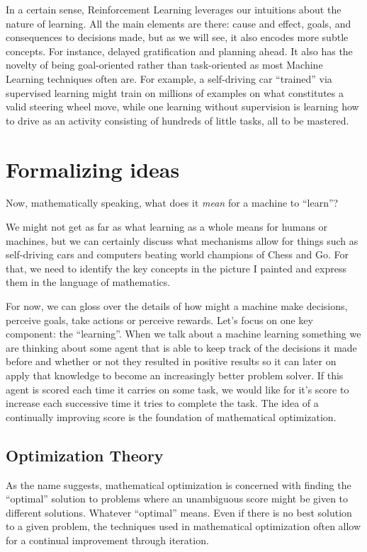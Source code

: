 In a certain sense, Reinforcement Learning leverages our 
intuitions about the nature of learning. All the main elements 
are there: cause and effect, goals, and consequences to 
decisions made, but as we will see, it also encodes more subtle 
concepts. For instance, delayed gratification and planning 
ahead. It also has the novelty of being goal-oriented rather 
than task-oriented as most Machine Learning techniques often 
are. For example, a self-driving car ``trained'' via supervised 
learning might train on millions of examples on what constitutes 
a valid steering wheel move, while one learning without 
supervision is learning how to drive as an activity consisting 
of hundreds of little tasks, all to be mastered.

\section{Formalizing ideas}
Now, mathematically speaking, what does it \textit{mean} for a 
machine to ``learn''?

We might not get as far as what learning as a whole means for 
humans or machines, but we can certainly discuss what mechanisms 
allow for things such as self-driving cars and computers beating 
world champions of Chess and Go. For that, we need to identify 
the key concepts in the picture I painted and express them in 
the language of mathematics.

For now, we can gloss over the details of how might a machine 
make decisions, perceive goals, take actions or perceive 
rewards. Let's focus on one key component: the ``learning''. 
When we talk about a machine learning something we are thinking 
about some agent that is able to keep track of the decisions it 
made before and whether or not they resulted in positive results 
so it can later on apply that knowledge to become an 
increasingly better problem solver. If this agent is scored each 
time it carries on some task, we would like for it's score to 
increase each successive time it tries to complete the task. The 
idea of a continually improving score is the foundation of 
mathematical optimization.

\subsection{Optimization Theory}
As the name suggests, mathematical optimization is concerned 
with finding the ``optimal'' solution to problems where an 
unambiguous score might be given to different solutions.  
Whatever ``optimal'' means. Even if there is no best solution to 
a given problem, the techniques used in mathematical 
optimization often allow for a continual improvement through 
iteration.

